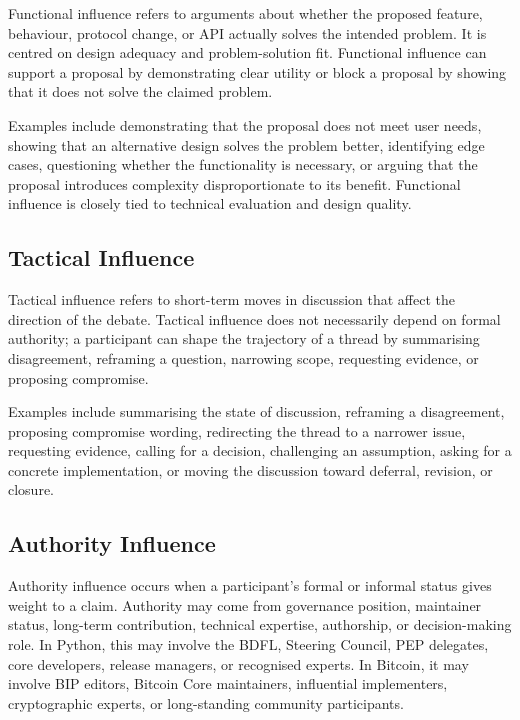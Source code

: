 Functional influence refers to arguments about whether the proposed feature, behaviour, protocol change, or API actually solves the intended problem. It is centred on design adequacy and problem-solution fit. Functional influence can support a proposal by demonstrating clear utility or block a proposal by showing that it does not solve the claimed problem.

Examples include demonstrating that the proposal does not meet user needs, showing that an alternative design solves the problem better, identifying edge cases, questioning whether the functionality is necessary, or arguing that the proposal introduces complexity disproportionate to its benefit. Functional influence is closely tied to technical evaluation and design quality.

\subsection{Tactical Influence}

Tactical influence refers to short-term moves in discussion that affect the direction of the debate. Tactical influence does not necessarily depend on formal authority; a participant can shape the trajectory of a thread by summarising disagreement, reframing a question, narrowing scope, requesting evidence, or proposing compromise.

Examples include summarising the state of discussion, reframing a disagreement, proposing compromise wording, redirecting the thread to a narrower issue, requesting evidence, calling for a decision, challenging an assumption, asking for a concrete implementation, or moving the discussion toward deferral, revision, or closure.

\subsection{Authority Influence}

Authority influence occurs when a participant's formal or informal status gives weight to a claim. Authority may come from governance position, maintainer status, long-term contribution, technical expertise, authorship, or decision-making role. In Python, this may involve the BDFL, Steering Council, PEP delegates, core developers, release managers, or recognised experts. In Bitcoin, it may involve BIP editors, Bitcoin Core maintainers, influential implementers, cryptographic experts, or long-standing community participants.

